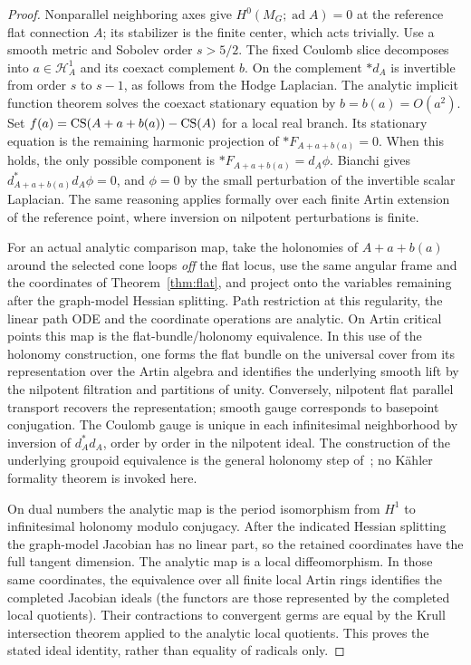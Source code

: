 \begin{proof}
Nonparallel neighboring axes give \(H^0(M_G;\operatorname{ad}A)=0\) at the reference flat connection \(A\); its stabilizer is the finite center, which acts trivially. Use a smooth metric and Sobolev order \(s>5/2\). The fixed Coulomb slice decomposes into \(a\in\mathcal H^1_A\) and its coexact complement \(b\). On the complement \(*d_A\) is invertible from order \(s\) to \(s-1\), as follows from the Hodge Laplacian. The analytic implicit function theorem solves the coexact stationary equation by \(b=b(a)=O(a^2)\). Set \(f(a)=\operatorname{CS}(A+a+b(a))-\operatorname{CS}(A)\) for a local real branch. Its stationary equation is the remaining harmonic projection of \(*F_{A+a+b(a)}=0\). When this holds, the only possible component is \(*F_{A+a+b(a)}=d_A\phi\). Bianchi gives \(d_{A+a+b(a)}^*d_A\phi=0\), and \(\phi=0\) by the small perturbation of the invertible scalar Laplacian. The same reasoning applies formally over each finite Artin extension of the reference point, where inversion on nilpotent perturbations is finite.

For an actual analytic comparison map, take the holonomies of \(A+a+b(a)\) around the selected cone loops \emph{off} the flat locus, use the same angular frame and the coordinates of Theorem~\ref{thm:flat}, and project onto the variables remaining after the graph-model Hessian splitting. Path restriction at this regularity, the linear path ODE and the coordinate operations are analytic. On Artin critical points this map is the flat-bundle/holonomy equivalence. In this use of the holonomy construction, one forms the flat bundle on the universal cover from its representation over the Artin algebra and identifies the underlying smooth lift by the nilpotent filtration and partitions of unity. Conversely, nilpotent flat parallel transport recovers the representation; smooth gauge corresponds to basepoint conjugation. The Coulomb gauge is unique in each infinitesimal neighborhood by inversion of \(d_A^*d_A\), order by order in the nilpotent ideal. The construction of the underlying groupoid equivalence is the general holonomy step of~\cite[Sec.~6]{GoldmanMillson}; no K\"ahler formality theorem is invoked here.

On dual numbers the analytic map is the period isomorphism from \(H^1\) to infinitesimal holonomy modulo conjugacy. After the indicated Hessian splitting the graph-model Jacobian has no linear part, so the retained coordinates have the full tangent dimension. The analytic map is a local diffeomorphism. In those same coordinates, the equivalence over all finite local Artin rings identifies the completed Jacobian ideals (the functors are those represented by the completed local quotients). Their contractions to convergent germs are equal by the Krull intersection theorem applied to the analytic local quotients. This proves the stated ideal identity, rather than equality of radicals only.
\end{proof}
